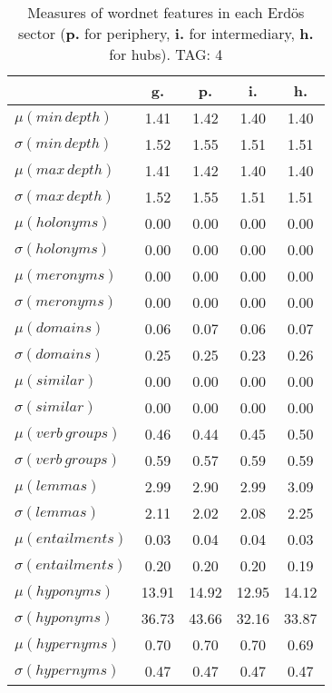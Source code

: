\begin{table}[h!]
\begin{center}
\begin{tabular}{| l | c | c | c | c |}\hline
 & g. & p. & i. & h. \\\hline
$\mu(min\,depth)$ & 1.41  & 1.42  & 1.40  & 1.40 \\\hline
$\sigma(min\,depth)$ & 1.52  & 1.55  & 1.51  & 1.51 \\\hline
$\mu(max\,depth)$ & 1.41  & 1.42  & 1.40  & 1.40 \\\hline
$\sigma(max\,depth)$ & 1.52  & 1.55  & 1.51  & 1.51 \\\hline
$\mu(holonyms)$ & 0.00  & 0.00  & 0.00  & 0.00 \\\hline
$\sigma(holonyms)$ & 0.00  & 0.00  & 0.00  & 0.00 \\\hline
$\mu(meronyms)$ & 0.00  & 0.00  & 0.00  & 0.00 \\\hline
$\sigma(meronyms)$ & 0.00  & 0.00  & 0.00  & 0.00 \\\hline
$\mu(domains)$ & 0.06  & 0.07  & 0.06  & 0.07 \\\hline
$\sigma(domains)$ & 0.25  & 0.25  & 0.23  & 0.26 \\\hline
$\mu(similar)$ & 0.00  & 0.00  & 0.00  & 0.00 \\\hline
$\sigma(similar)$ & 0.00  & 0.00  & 0.00  & 0.00 \\\hline
$\mu(verb\,groups)$ & 0.46  & 0.44  & 0.45  & 0.50 \\\hline
$\sigma(verb\,groups)$ & 0.59  & 0.57  & 0.59  & 0.59 \\\hline
$\mu(lemmas)$ & 2.99  & 2.90  & 2.99  & 3.09 \\\hline
$\sigma(lemmas)$ & 2.11  & 2.02  & 2.08  & 2.25 \\\hline
$\mu(entailments)$ & 0.03  & 0.04  & 0.04  & 0.03 \\\hline
$\sigma(entailments)$ & 0.20  & 0.20  & 0.20  & 0.19 \\\hline
$\mu(hyponyms)$ & 13.91  & 14.92  & 12.95  & 14.12 \\\hline
$\sigma(hyponyms)$ & 36.73  & 43.66  & 32.16  & 33.87 \\\hline
$\mu(hypernyms)$ & 0.70  & 0.70  & 0.70  & 0.69 \\\hline
$\sigma(hypernyms)$ & 0.47  & 0.47  & 0.47  & 0.47 \\\hline
\end{tabular}
\caption{Measures of wordnet features in each Erd\"os sector ({{\bf p.}} for periphery, {{\bf i.}} for intermediary, {{\bf h.}} for hubs). TAG: 4}
\end{center}
\end{table}